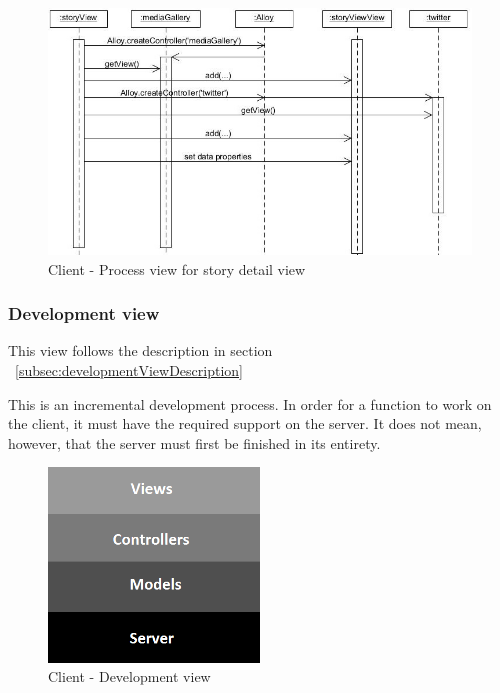 \documentclass[11pt]{book}
\begin{document}
\begin{figure}[H]
      \centering
      \includegraphics[width=1.0\textwidth]{Figures/Architecture/Sequence/client/storyView.jpg}
      \caption{Client - Process view for story detail view}
      \label{fig:arch_client_process_storyDetail}
\end{figure}


\subsubsection{Development view}
This view follows the description in section ~\ref{subsec:developmentViewDescription}

This is an incremental development process. In order for a function to work on the client, it must have the required support on the server. It does not mean, however, that the server must first be finished in its entirety.

\begin{figure}[H]
      \centering
      \includegraphics[width=0.5\textwidth]{Figures/Architecture/clientDevelopmentView.png}
      \caption{Client - Development view}
      \label{fig:arch_client_development}
\end{figure}
\end{document}
